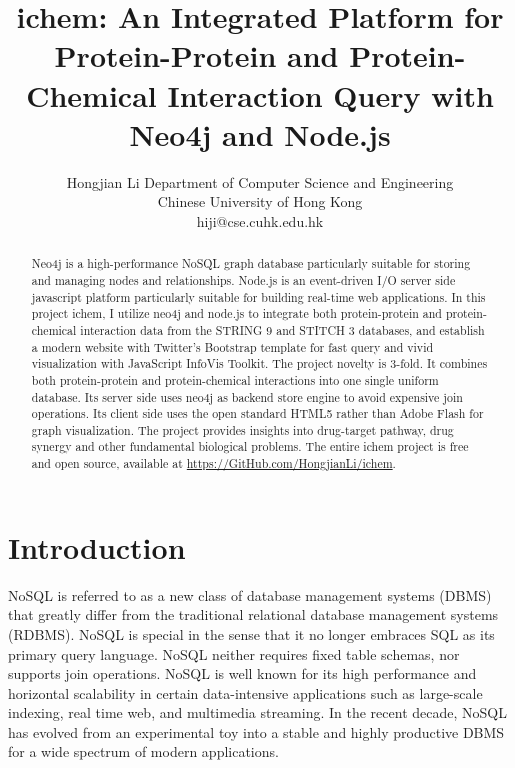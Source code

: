 \documentclass[10pt,conference,compsocconf]{../IEEEtran}
\begin{document}
\title{ichem: An Integrated Platform for Protein-Protein and Protein-Chemical Interaction Query with Neo4j and Node.js}
\author
{
\IEEEauthorblockN
{
Hongjian Li
\IEEEauthorblockA
{
Department of Computer Science and Engineering\\
Chinese University of Hong Kong\\
hiji@cse.cuhk.edu.hk
}
}
}
\maketitle

\begin{abstract}

Neo4j is a high-performance NoSQL graph database particularly suitable for storing and managing nodes and relationships. Node.js is an event-driven I/O server side javascript platform particularly suitable for building real-time web applications. In this project ichem, I utilize neo4j and node.js to integrate both protein-protein and protein-chemical interaction data from the STRING 9 and STITCH 3 databases, and establish a modern website with Twitter's Bootstrap template for fast query and vivid visualization with JavaScript InfoVis Toolkit. The project novelty is 3-fold. It combines both protein-protein and protein-chemical interactions into one single uniform database. Its server side uses neo4j as backend store engine to avoid expensive join operations. Its client side uses the open standard HTML5 rather than Adobe Flash for graph visualization. The project provides insights into drug-target pathway, drug synergy and other fundamental biological problems. The entire ichem project is free and open source, available at \url{https://GitHub.com/HongjianLi/ichem}.

\end{abstract}

\section{Introduction}

NoSQL is referred to as a new class of database management systems (DBMS) that greatly differ from the traditional relational database management systems (RDBMS). NoSQL is special in the sense that it no longer embraces SQL as its primary query language. NoSQL neither requires fixed table schemas, nor supports join operations. NoSQL is well known for its high performance and horizontal scalability in certain data-intensive applications such as large-scale indexing, real time web, and multimedia streaming. In the recent decade, NoSQL has evolved from an experimental toy into a stable and highly productive DBMS for a wide spectrum of modern applications.
\end{document}
